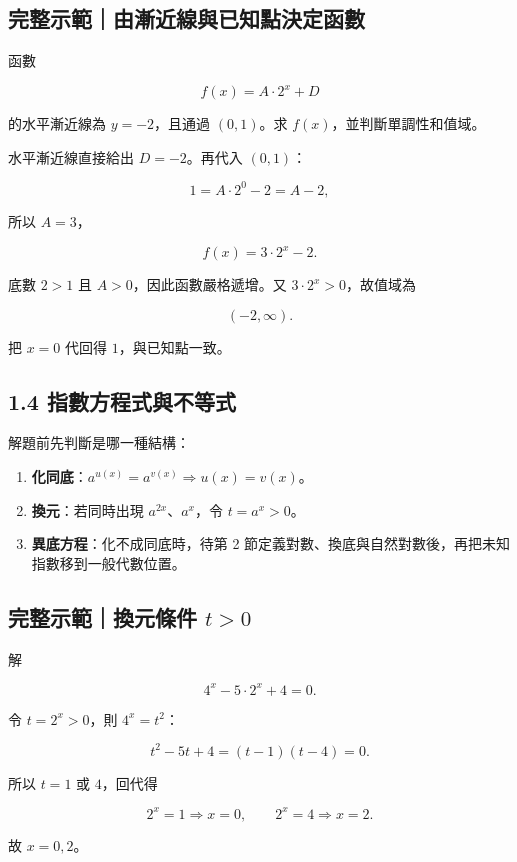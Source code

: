 \documentclass[11pt,a4paper]{article}
\providecommand{\tightlist}{%
  \setlength{\itemsep}{0pt}\setlength{\parskip}{0pt}}
\begin{document}
\begin{HandoutWorkedExample}

\subsection{完整示範｜由漸近線與已知點決定函數}\label{ux5b8cux6574ux793aux7bc4ux7531ux6f38ux8fd1ux7ddaux8207ux5df2ux77e5ux9edeux6c7aux5b9aux51fdux6578}

函數

\[
f(x)=A\cdot2^x+D
\]

的水平漸近線為 \(y=-2\)，且通過 \((0,1)\)。求 \(f(x)\)，並判斷單調性和值域。

水平漸近線直接給出 \(D=-2\)。再代入 \((0,1)\)：

\[
1=A\cdot2^0-2=A-2,
\]

所以 \(A=3\)，

\[
\boxed{f(x)=3\cdot2^x-2}.
\]

底數 \(2>1\) 且 \(A>0\)，因此函數嚴格遞增。又 \(3\cdot2^x>0\)，故值域為

\[
\boxed{(-2,\infty)}.
\]

把 \(x=0\) 代回得 \(1\)，與已知點一致。

\end{HandoutWorkedExample}

\subsection{1.4 指數方程式與不等式}\label{ux6307ux6578ux65b9ux7a0bux5f0fux8207ux4e0dux7b49ux5f0f}

解題前先判斷是哪一種結構：

\begin{enumerate}
\def\labelenumi{\arabic{enumi}.}
\tightlist
\item
  \textbf{化同底}：\(a^{u(x)}=a^{v(x)}\Rightarrow u(x)=v(x)\)。
\item
  \textbf{換元}：若同時出現 \(a^{2x}\)、\(a^x\)，令 \(t=a^x>0\)。
\item
  \textbf{異底方程}：化不成同底時，待第 2 節定義對數、換底與自然對數後，再把未知指數移到一般代數位置。
\end{enumerate}

\begin{HandoutWorkedExample}

\subsection{\texorpdfstring{完整示範｜換元條件 \(t>0\)}{完整示範｜換元條件 t\textgreater0}}\label{ux5b8cux6574ux793aux7bc4ux63dbux5143ux689dux4ef6-t0}

解

\[
4^x-5\cdot2^x+4=0.
\]

令 \(t=2^x>0\)，則 \(4^x=t^2\)：

\[
t^2-5t+4=(t-1)(t-4)=0.
\]

所以 \(t=1\) 或 \(4\)，回代得

\[
2^x=1\Rightarrow x=0,\qquad
2^x=4\Rightarrow x=2.
\]

故 \(\boxed{x=0,2}\)。

\end{HandoutWorkedExample}
\end{document}
